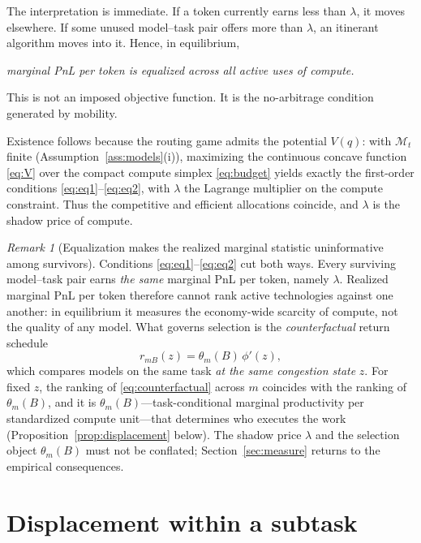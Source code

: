 \documentclass[11pt]{article}
\theoremstyle{definition}
\theoremstyle{remark}
\newtheorem{remark}{Remark}
\begin{document}
The interpretation is immediate. If a token currently earns less than $\lambda$, it moves elsewhere. If some unused model--task pair offers more than $\lambda$, an itinerant algorithm moves into it. Hence, in equilibrium,
\begin{center}
\emph{marginal PnL per token is equalized across all active uses of compute.}
\end{center}
This is not an imposed objective function. It is the no-arbitrage condition generated by mobility.

Existence follows because the routing game admits the potential $V(q)$: with $\mathcal{M}_t$ finite (Assumption~\ref{ass:models}(i)), maximizing the continuous concave function \eqref{eq:V} over the compact compute simplex \eqref{eq:budget} yields exactly the first-order conditions \eqref{eq:eq1}--\eqref{eq:eq2}, with $\lambda$ the Lagrange multiplier on the compute constraint. Thus the competitive and efficient allocations coincide, and $\lambda$ is the shadow price of compute.

\begin{remark}[Equalization makes the realized marginal statistic uninformative among survivors]
\label{rem:uninformative}
Conditions \eqref{eq:eq1}--\eqref{eq:eq2} cut both ways. Every surviving model--task pair earns \emph{the same} marginal PnL per token, namely $\lambda$. Realized marginal PnL per token therefore cannot rank active technologies against one another: in equilibrium it measures the economy-wide scarcity of compute, not the quality of any model. What governs selection is the \emph{counterfactual} return schedule
\begin{equation}
\label{eq:counterfactual}
r_{mB}(z) = \theta_m(B)\, \phi'(z),
\end{equation}
which compares models on the same task \emph{at the same congestion state} $z$. For fixed $z$, the ranking of \eqref{eq:counterfactual} across $m$ coincides with the ranking of $\theta_m(B)$, and it is $\theta_m(B)$---task-conditional marginal productivity per standardized compute unit---that determines who executes the work (Proposition~\ref{prop:displacement} below). The shadow price $\lambda$ and the selection object $\theta_m(B)$ must not be conflated; Section~\ref{sec:measure} returns to the empirical consequences.
\end{remark}

\section{Displacement within a subtask}
\label{sec:displacement}
\end{document}
